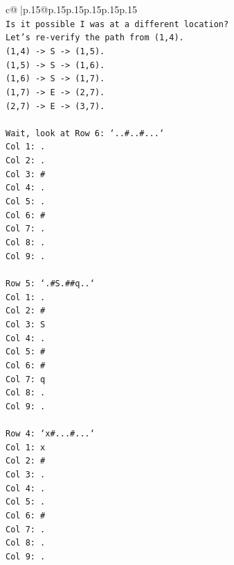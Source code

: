\documentclass{article}
\begin{document}
{\begin{supertabular}{c@{$\;$}|p{.15\linewidth}@{}p{.15\linewidth}p{.15\linewidth}p{.15\linewidth}p{.15\linewidth}p{.15\linewidth}}
{{{\\ 
\texttt{Is it possible I was at a different location?} \\
\texttt{Let's re{-}verify the path from (1,4).} \\
\texttt{(1,4) {-}> S {-}> (1,5).} \\
\texttt{(1,5) {-}> S {-}> (1,6).} \\
\texttt{(1,6) {-}> S {-}> (1,7).} \\
\texttt{(1,7) {-}> E {-}> (2,7).} \\
\texttt{(2,7) {-}> E {-}> (3,7).} \\
\\ 
\texttt{Wait, look at Row 6: `..\#..\#...`} \\
\texttt{Col 1: .} \\
\texttt{Col 2: .} \\
\texttt{Col 3: \#} \\
\texttt{Col 4: .} \\
\texttt{Col 5: .} \\
\texttt{Col 6: \#} \\
\texttt{Col 7: .} \\
\texttt{Col 8: .} \\
\texttt{Col 9: .} \\
\\ 
\texttt{Row 5: `.\#S.\#\#q..`} \\
\texttt{Col 1: .} \\
\texttt{Col 2: \#} \\
\texttt{Col 3: S} \\
\texttt{Col 4: .} \\
\texttt{Col 5: \#} \\
\texttt{Col 6: \#} \\
\texttt{Col 7: q} \\
\texttt{Col 8: .} \\
\texttt{Col 9: .} \\
\\ 
\texttt{Row 4: `x\#...\#...`} \\
\texttt{Col 1: x} \\
\texttt{Col 2: \#} \\
\texttt{Col 3: .} \\
\texttt{Col 4: .} \\
\texttt{Col 5: .} \\
\texttt{Col 6: \#} \\
\texttt{Col 7: .} \\
\texttt{Col 8: .} \\
\texttt{Col 9: .} \\
}}}
\end{supertabular}}
\end{document}

